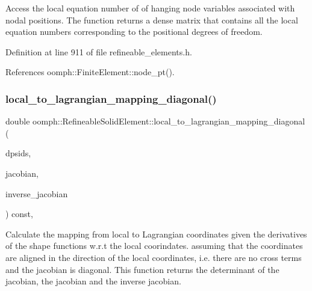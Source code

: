 Access the local equation number of of hanging node variables associated with nodal positions. The function returns a dense matrix that contains all the local equation numbers corresponding to the positional degrees of freedom. 



Definition at line 911 of file refineable\+\_\+elements.\+h.



References oomph\+::\+Finite\+Element\+::node\+\_\+pt().

\mbox{\label{classoomph_1_1RefineableSolidElement_a492846d9f2c5d5235f9f3ff1001d4ec8}} 
\subsubsection{\texorpdfstring{local\+\_\+to\+\_\+lagrangian\+\_\+mapping\+\_\+diagonal()}{local\_to\_lagrangian\_mapping\_diagonal()}}
{\footnotesize\ttfamily double oomph\+::\+Refineable\+Solid\+Element\+::local\+\_\+to\+\_\+lagrangian\+\_\+mapping\+\_\+diagonal (\begin{DoxyParamCaption}\item[{const \hyperlink{classoomph_1_1DShape}{D\+Shape} \&}]{dpsids,  }\item[{\hyperlink{classoomph_1_1DenseMatrix}{Dense\+Matrix}$<$ double $>$ \&}]{jacobian,  }\item[{\hyperlink{classoomph_1_1DenseMatrix}{Dense\+Matrix}$<$ double $>$ \&}]{inverse\+\_\+jacobian }\end{DoxyParamCaption}) const\hspace{0.3cm}{\ttfamily [protected]}, {\ttfamily [virtual]}}



Calculate the mapping from local to Lagrangian coordinates given the derivatives of the shape functions w.\+r.\+t the local coorindates. assuming that the coordinates are aligned in the direction of the local coordinates, i.\+e. there are no cross terms and the jacobian is diagonal. This function returns the determinant of the jacobian, the jacobian and the inverse jacobian. 

